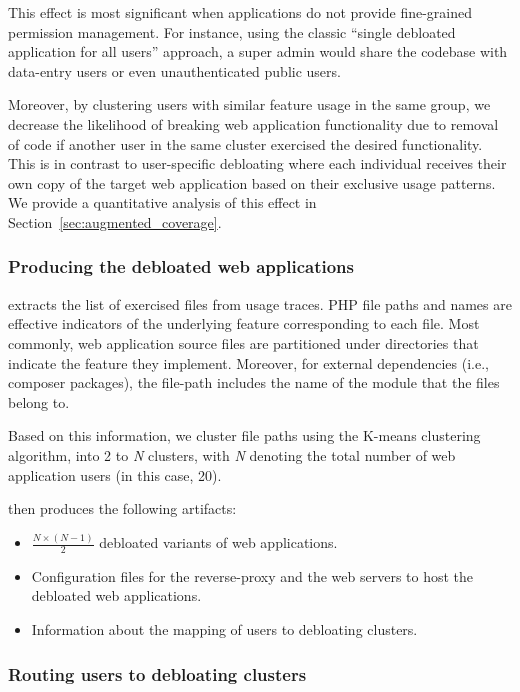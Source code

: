 This effect is most significant when applications do not provide fine-grained permission management. 
For instance, using the classic ``single debloated application for all users'' approach, a super admin would share the codebase with data-entry users or even unauthenticated public users. 

Moreover, by clustering users with similar feature usage in the same group, we decrease the likelihood of breaking web application functionality due to removal of code if another user in the same cluster exercised the desired functionality. 
This is in contrast to user-specific debloating where each individual receives their own copy of the target web application based on their exclusive usage patterns. 
We provide a quantitative analysis of this effect in Section~\ref{sec:augmented_coverage}.

\subsubsection{Producing the debloated web applications}

\sys{} extracts the list of exercised files from usage traces. 
PHP file paths and names are effective indicators of the underlying feature corresponding to each file. 
Most commonly, web application source files are partitioned under directories that indicate the feature they implement. 
Moreover, for external dependencies (i.e., composer packages), the file-path includes the name of the module that the files belong to. 

Based on this information, we cluster file paths using the K-means clustering algorithm, into 2 to \emph{N} clusters, with \emph{N} denoting the total number of web application users (in this case, 20).  

\sys{} then produces the following artifacts:
\begin{itemize}
    \item \( \frac{N \times (N - 1)}{2} \) debloated variants of web applications.
    \item Configuration files for the reverse-proxy and the web servers to host the debloated web applications.
    \item Information about the mapping of users to debloating clusters.
\end{itemize}

\subsubsection{Routing users to debloating clusters}

